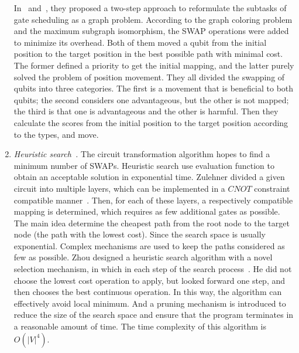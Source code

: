 \documentclass[runningheads]{llncs}
\begin{document}
\begin{enumerate}
   In~\cite{Guerreschi2018} and~\cite{Matsuo2019}, they proposed
   a two-step approach to reformulate the subtasks 
   of gate scheduling as a graph problem.
   According to the graph coloring problem and the maximum subgraph isomorphism,
   the SWAP operations were added to minimize its overhead.
   Both of them moved a qubit from the initial position to 
   the target position in the best possible path with minimal cost.
   The former defined a priority to get the initial mapping, 
   and the latter purely solved the problem of position movement. 
   They all divided the swapping of qubits into three categories. 
   The first is a movement that is beneficial to both qubits; 
   the second considers one advantageous, 
   but the other is not mapped; 
   the third is that one is advantageous and the other is harmful.
   Then they calculate the scores from the initial position 
   to the target position according to the types, and move.
	\item \emph{Heuristic search~\cite{Zulehner2017,Cowtan2019,Li2018,Xiangzhen2020,2018QubitSiraichi}.}
	The circuit transformation algorithm hopes to find a minimum number of SWAPs. 
	Heuristic search use evaluation function to obtain an acceptable solution in exponential time.
	Zulehner divided a given circuit into multiple layers, 
	which can be implemented in a $CNOT$ 
	constraint compatible manner~\cite{Zulehner2017}. Then, for each of these layers, 
	a respectively compatible mapping is determined, 
	which requires as few additional gates as possible. 
	The main idea  determine the cheapest path from the root node to the target node 
	(the path with the lowest cost). Since the search space is usually exponential.
	Complex mechanisms are used to keep the paths considered as few as possible.
	Zhou designed a heuristic search algorithm with a novel selection 
	mechanism, in which in each step of the search process~\cite{Xiangzhen2020}.
	He did not choose the lowest cost operation to apply, 
	but looked forward one step, and then chooses the best continuous operation. 
	In this way, the algorithm can effectively avoid local minimum. 
	And a pruning mechanism is introduced 
	to reduce the size of the search space and ensure that the program 
	terminates in a reasonable amount of time. 
	The time complexity of this algorithm is $O(|V|^{4})$.
	

\end{enumerate}
\end{document}
